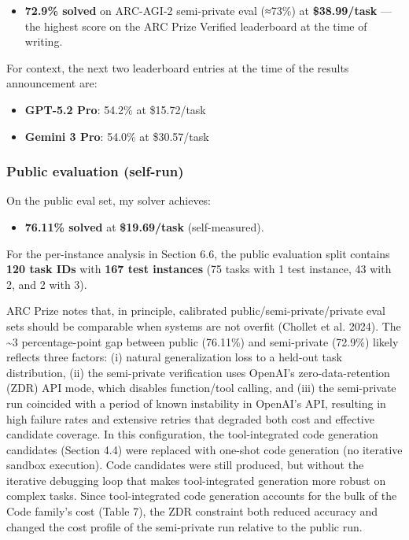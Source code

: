 \documentclass[11pt]{article}
\providecommand{\tightlist}{%
  \setlength{\itemsep}{0pt}\setlength{\parskip}{0pt}}
\begin{document}
\begin{itemize}
\tightlist
\item
  \textbf{72.9\% solved} on ARC-AGI-2 semi-private eval (≈73\%) at
  \textbf{\$38.99/task} --- the highest score on the ARC Prize Verified
  leaderboard at the time of writing.
\end{itemize}

For context, the next two leaderboard entries at the time of the results
announcement are:

\begin{itemize}
\tightlist
\item
  \textbf{GPT-5.2 Pro}: 54.2\% at \$15.72/task
\item
  \textbf{Gemini 3 Pro}: 54.0\% at \$30.57/task
\end{itemize}

\hypertarget{public-evaluation-self-run}{%
\subsubsection{Public evaluation
(self-run)}\label{public-evaluation-self-run}}

On the public eval set, my solver achieves:

\begin{itemize}
\tightlist
\item
  \textbf{76.11\% solved} at \textbf{\$19.69/task} (self-measured).
\end{itemize}

For the per-instance analysis in Section 6.6, the public evaluation
split contains \textbf{120 task IDs} with \textbf{167 test instances}
(75 tasks with 1 test instance, 43 with 2, and 2 with 3).

ARC Prize notes that, in principle, calibrated
public/semi-private/private eval sets should be comparable when systems
are not overfit (Chollet et al. 2024). The \textasciitilde3
percentage-point gap between public (76.11\%) and semi-private (72.9\%)
likely reflects three factors: (i) natural generalization loss to a
held-out task distribution, (ii) the semi-private verification uses
OpenAI's zero-data-retention (ZDR) API mode, which disables
function/tool calling, and (iii) the semi-private run coincided with a
period of known instability in OpenAI's API, resulting in high failure
rates and extensive retries that degraded both cost and effective
candidate coverage. In this configuration, the tool-integrated code
generation candidates (Section 4.4) were replaced with one-shot code
generation (no iterative sandbox execution). Code candidates were still
produced, but without the iterative debugging loop that makes
tool-integrated generation more robust on complex tasks. Since
tool-integrated code generation accounts for the bulk of the Code
family's cost (Table 7), the ZDR constraint both reduced accuracy and
changed the cost profile of the semi-private run relative to the public
run.
\end{document}
